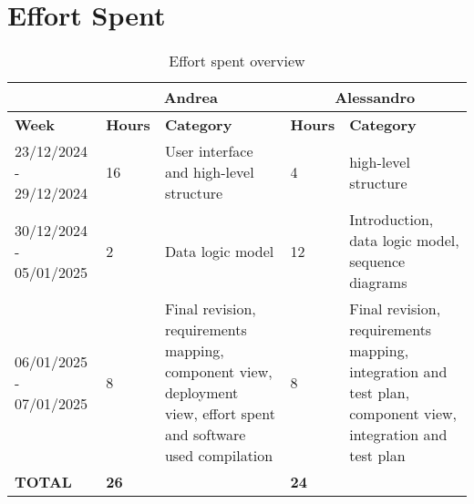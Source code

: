 \chapter{Effort Spent}
\begin{center}
	\begin{table}[H]
		\begin{tabular}{ | m{3.2cm} | m{1cm}| m{4cm} | m{1.5cm}| m{4cm} | } 
			\hline
			&  \multicolumn{2}{c|}{ Andrea} & \multicolumn{2}{c|}{ Alessandro} \\ 
			\hline
			\textbf{Week} & \textbf{Hours}   & \textbf{Category} & \textbf{Hours}       & \textbf{Category} \\
			\hline
			23/12/2024 - 29/12/2024 & 16 & User interface and high-level structure & 4 & high-level structure\\
			\hline
			30/12/2024 - 05/01/2025 & 2 & Data logic model & 12 & Introduction, data logic model, sequence diagrams\\
			\hline
			06/01/2025 - 07/01/2025 & 8 & Final revision, requirements mapping, component view, deployment view, effort spent and software used compilation & 8 & Final revision, requirements mapping, integration and test plan, component view, integration and test plan\\
			\hline
			\textbf{TOTAL} & \textbf{26} & & \textbf{24} & \\
			\hline
		\end{tabular}
		\caption{Effort spent overview}
	\end{table}
\end{center}